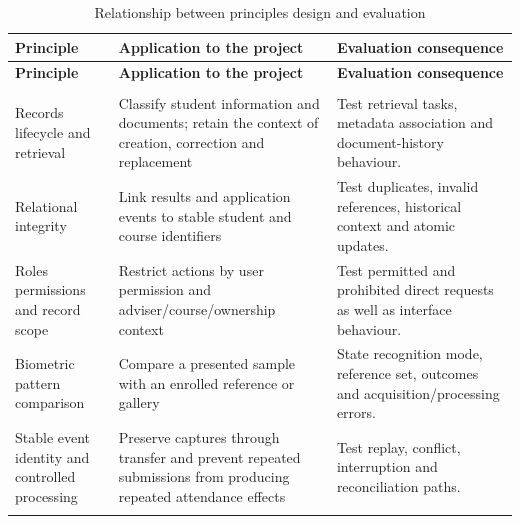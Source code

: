 \begingroup
\singlespacing%
\setlength{\tabcolsep}{4pt}
\begin{longtable}{@{}>{\RaggedRight\arraybackslash}p{}>{\RaggedRight\arraybackslash}p{}>{\RaggedRight\arraybackslash}p{}@{}}
\caption{Relationship between principles design and evaluation}\label{tab:2-2}\\
\toprule
\textbf{Principle} & \textbf{Application to the project} & \textbf{Evaluation consequence} \\
\midrule
\endfirsthead%
\toprule
\textbf{Principle} & \textbf{Application to the project} & \textbf{Evaluation consequence} \\
\midrule
\endhead%
\midrule
\multicolumn{3}{r}{Continued on next page}\\
\endfoot%
\bottomrule
\endlastfoot%
Records lifecycle and retrieval & Classify student information and documents; retain the context of creation, correction and replacement & Test retrieval tasks, metadata association and document-history behaviour. \\ \addlinespace
Relational integrity & Link results and application events to stable student and course identifiers & Test duplicates, invalid references, historical context and atomic updates. \\ \addlinespace
Roles permissions and record scope & Restrict actions by user permission and adviser/course/ownership context & Test permitted and prohibited direct requests as well as interface behaviour. \\ \addlinespace
Biometric pattern comparison & Compare a presented sample with an enrolled reference or gallery & State recognition mode, reference set, outcomes and acquisition/processing errors. \\ \addlinespace
Stable event identity and controlled processing & Preserve captures through transfer and prevent repeated submissions from producing repeated attendance effects & Test replay, conflict, interruption and reconciliation paths. \\ \addlinespace
\end{longtable}
\endgroup

